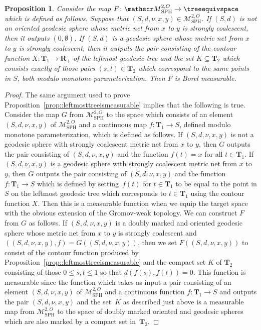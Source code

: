 \documentclass[10pt]{amsart}
\let\mathcal\mathscr
\theoremstyle{plain}
\numberwithin{theorem}{section}
\newtheorem{proposition}[theorem]{Proposition}
\theoremstyle{definition}
\newcommand\gmsspace{{\mathcal M}_{\mathrm{SPH}}}
\newcommand{\R}{\mathbf{R}}
\newcommand{\T}{\mathbf{T}}
\begin{document}
\begin{proposition}
\label{prop:equiv_measurable}
Consider the map $F \colon \gmsspace^{2,O} \to \treeequivspace$ which is defined as follows. Suppose that $(S,d,\nu,x,y) \in \gmsspace^{2,O}$. If $(S,d)$ is not an oriented geodesic sphere whose metric net from $x$ to $y$ is strongly coalescent, then it outputs $(0,\emptyset)$. If $(S,d)$ is a geodesic sphere whose metric net from $x$ to $y$ is strongly coalescent, then it outputs the pair consisting of the contour function $X \colon \T_1 \to \R_+$ of the leftmost geodesic tree and the set $K \subseteq \T_2$ which consists exactly of those pairs $(s,t) \in \T_2$ which correspond to the same points in $S$, both modulo monotone parameterization. Then $F$ is Borel measurable.
\end{proposition}
\begin{proof}
The same argument used to prove Proposition~\ref{prop::leftmosttreeismeasurable} implies that the following is true. Consider the map $G$ from $\gmsspace^{2,O}$ to the space which consists of an element $(S,d,\nu,x,y)$ of $\gmsspace^{2,O}$ and a continuous map $f \colon \T_1 \to S$, defined modulo monotone parameterization, which is defined as follows. If $(S,d,\nu,x,y)$ is not a geodesic sphere with strongly coalescent metric net from $x$ to $y$, then $G$ outputs the pair consisting of $(S,d,\nu,x,y)$ and the function $f(t) = x$ for all $t \in \T_1$. If $(S,d,\nu,x,y)$ is a geodesic sphere with strongly coalescent metric net from $x$ to $y$, then $G$ outputs the pair consisting of $(S,d,\nu,x,y)$ and the function $f \colon \T_1 \to S$ which is defined by setting~$f(t)$ for $t \in \T_1$ to be equal to the point in $S$ on the leftmost geodesic tree which corresponds to $t \in \T_1$ using the contour function $X$. Then this is a measurable function when we equip the target space with the obvious extension of the Gromov-weak topology. We can construct $F$ from $G$ as follows. If $(S,d,\nu,x,y)$ is a doubly marked and oriented geodesic sphere whose metric net from $x$ to $y$ is strongly coalescent and $((S,d,\nu,x,y),f) = G((S,d,\nu,x,y))$, then we set $F( (S,d,\nu,x,y))$ to consist of the contour function produced by Proposition~\ref{prop::leftmosttreeismeasurable} and the compact set $K$ of $\T_2$ consisting of those $0 \leq s,t \leq 1$ so that $d(f(s),f(t)) = 0$. This function is measurable since the function which takes as input a pair consisting of an element $(S,d,\nu,x,y)$ of $\gmsspace^{2,O}$ and a continuous function $f \colon \T_1 \to S$ and outputs the pair $(S,d,\nu,x,y)$ and the set~$K$ as described just above is a measurable map from $\gmsspace^{2,O}$ to the space of doubly marked oriented and geodesic spheres which are also marked by a compact set in~$\T_2$.
\end{proof}
\end{document}
